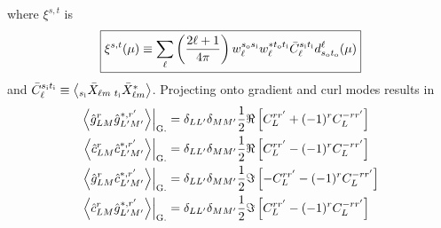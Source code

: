 \documentclass[reprint,prd, superscriptaddress, tightenlines, longbibliography, nofootinbib, eqsecnum, amsfonts, amsmath, floatfix, notitlepage, twocolumn]{revtex4-1}
\newcommand{\si}[0]{{s_{\rm i}}}
\newcommand{\ti}[0]{{t_{\rm i}}}
\newcommand{\so}[0]{{s_{\rm o}}}
\renewcommand{\to}[0]{{t_{\rm o}}}
\newcommand{\av}[1]{\left\langle #1 \right\rangle}
\begin{document}

where $\xi^{s,t}$ is
\begin{equation}\boxed{
\xi^{s,t}(\mu) \equiv  \sum_\ell \left(\frac{2\ell + 1}{4\pi}\right)w^{\so\si}_\ell w^{*\to\ti}_\ell \bar C_\ell^{\si \ti} d^\ell_{\so\to}(\mu)}
\end{equation}
and $\bar C_\ell^{\si \ti} \equiv \av{ _{\si}\bar X_{\ell m}\: _{\ti} \bar X^*_{\ell m} }$.
Projecting onto gradient and curl modes results in
\begin{equation}
\begin{split}
\left.\av{\hat g^{r}_{LM} \hat g^{*, r'}_{L' M'} }\right|_{\rm G.} &=\delta_{LL'}\delta_{MM'} \frac 12 \Re\left[C_L^{rr'} +  (-1)^{r} C_L^{-rr'}\right] \\
		\left.\av{\hat c^{r}_{LM} \hat c^{*, r'}_{L' M'} }\right|_{\rm G.} &= \delta_{LL'}\delta_{MM'}\frac 12 \Re\left[C_L^{rr'} -  (-1)^{r} C_L^{-rr'}\right]\\
	\left.\av{\hat g^{r}_{LM} \hat c^{*, r'}_{L' M'} }\right|_{\rm G.} &= \delta_{LL'}\delta_{MM'}\frac 12 \Im\left[-C_L^{rr'} -  (-1)^{r} C_L^{-rr'}\right] \\ \left.\av{\hat c^{r}_{LM} \hat g^{*, r'}_{L' M'} }\right|_{\rm G.} &= \delta_{LL'}\delta_{MM'}\frac 12 \Im\left[C_L^{rr'} -  (-1)^{r} C_L^{-rr'}\right]
\end{split}
\end{equation}
\end{document}

